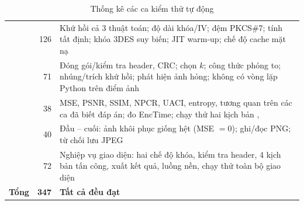 \begin{table}[H]
\centering
\caption{Thống kê các ca kiểm thử tự động}
\label{tab:tests}
\small
\begin{tabularx}{\linewidth}{@{}P{4.6cm}rL@{}}
\toprule
{} &  & \\
\midrule
{}   & 126 & Khứ hồi cả 3 thuật toán; độ dài khóa/IV; đệm PKCS\#7; tính tất định; khóa 3DES suy biến; JIT warm-up; chế độ cache mặt nạ\\
      & 71  & Đóng gói/kiểm tra header, CRC; chọn $k$; công thức phóng to; nhúng/trích khứ hồi; phát hiện ảnh hỏng; không có vòng lặp Python trên điểm ảnh\\
  & 38  & MSE, PSNR, SSIM, NPCR, UACI, entropy, tương quan trên các ca đã biết đáp án; đo EncTime; chạy thử hai kịch bản , \\
 & 40  & Đầu -- cuối: ảnh khôi phục giống hệt (MSE $=0$); ghi/đọc PNG; từ chối lưu JPEG\\
 & 72 & Nghiệp vụ giao diện: hai chế độ khóa, kiểm tra header, 4 kịch bản tấn công, xuất kết quả, luồng nền, chạy thử toàn bộ giao diện\\
\midrule
\textbf{Tổng} & \textbf{347} & \textbf{Tất cả đều đạt}\\
\bottomrule
\end{tabularx}
\end{table}


